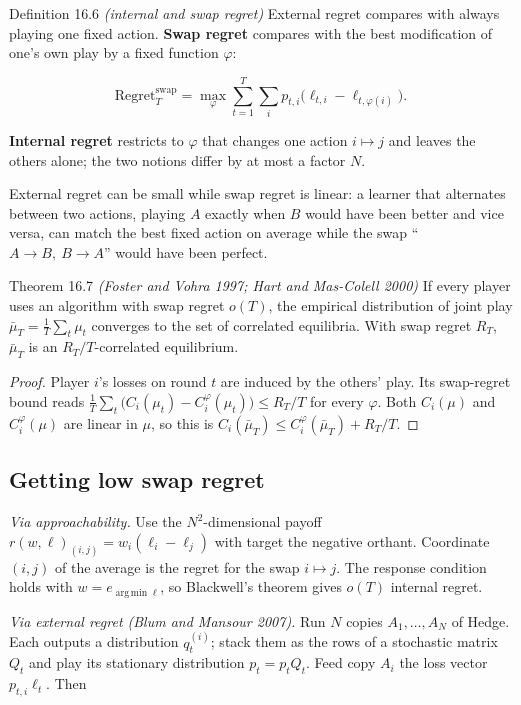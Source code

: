 \documentclass[11pt,a4paper,openany]{book}
\newcommand{\Reg}{\mathrm{Regret}}
\DeclareMathOperator*{\argmin}{arg\,min}
\begin{document}
\begin{bdef}{Definition 16.6 \emph{(internal and swap regret)}}
External regret compares with always playing one fixed action. \textbf{Swap regret} compares with the best modification of one's own play by a fixed function $\varphi$:

\[\Reg^{\mathrm{swap}}_T=\max_{\varphi}\sum_{t=1}^T\sum_ip_{t,i}\big(\ell_{t,i}-\ell_{t,\varphi(i)}\big).\]

\textbf{Internal regret} restricts to $\varphi$ that changes one action $i\mapsto j$ and leaves the others alone; the two notions differ by at most a factor $N$.
\end{bdef}

External regret can be small while swap regret is linear: a learner that alternates between two actions, playing $A$ exactly when $B$ would have been better and vice versa, can match the best fixed action on average while the swap ``$A\to B,\ B\to A$'' would have been perfect.

\begin{bthm}{Theorem 16.7 \emph{(Foster and Vohra 1997; Hart and Mas-Colell 2000)}}
If every player uses an algorithm with swap regret $o(T)$, the empirical distribution of joint play $\bar\mu_T=\frac1T\sum_t\mu_t$ converges to the set of correlated equilibria. With swap regret $R_T$, $\bar\mu_T$ is an $R_T/T$-correlated equilibrium.
\end{bthm}

\begin{proof}
Player $i$'s losses on round $t$ are induced by the others' play. Its swap-regret bound reads $\frac1T\sum_t\big(C_i(\mu_t)-C^\varphi_i(\mu_t)\big)\le R_T/T$ for every $\varphi$. Both $C_i(\mu)$ and $C_i^\varphi(\mu)$ are linear in $\mu$, so this is $C_i(\bar\mu_T)\le C_i^\varphi(\bar\mu_T)+R_T/T$.
\end{proof}

\subsection*{Getting low swap regret}

\emph{Via approachability.} Use the $N^2$-dimensional payoff $r(w,\ell)_{(i,j)}=w_i(\ell_i-\ell_j)$ with target the negative orthant. Coordinate $(i,j)$ of the average is the regret for the swap $i\mapsto j$. The response condition holds with $w=e_{\argmin\ell}$, so Blackwell's theorem gives $o(T)$ internal regret.

\emph{Via external regret (Blum and Mansour 2007).} Run $N$ copies $A_1,\dots,A_N$ of Hedge. Each outputs a distribution $q^{(i)}_t$; stack them as the rows of a stochastic matrix $Q_t$ and play its stationary distribution $p_t=p_tQ_t$. Feed copy $A_i$ the loss vector $p_{t,i}\ell_t$. Then
\end{document}

